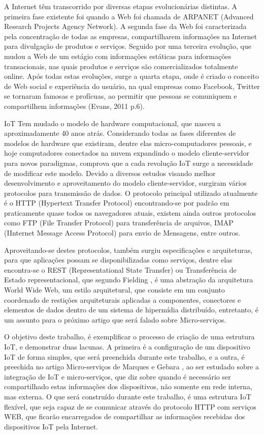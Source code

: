 \documentclass[journal]{IEEEtran}
\begin{document}
A Internet têm transcorrido por diversas etapas evolucionárias distintas. A primeira fase existente foi quando a Web foi chamada de ARPANET (Advanced Research Projects Agency Network). A segunda fase da Web foi caracterizada pela concentração de todas as empresas, compartilharem informações na Internet para divulgação de produtos e serviços. Seguido por uma terceira evolução, que mudou a Web de um estágio com informações estáticas para informações transacionais, nas quais produtos e serviços são comercializados totalmente online. Após todas estas evoluções, surge a quarta etapa, onde é criado o conceito de Web social e experiência do usuário, na qual empresas como Facebook, Twitter se tornaram famosas e profícuas, ao permitir que pessoas se comuniquem e compartilhem informações (Evans, 2011 p.6).

IoT Tem mudado o modelo de hardware computacional, que nasceu a aproximadamente 40 anos atrás. Considerando todas as fases diferentes de modelos de hardware que existiram, dentre elas micro-computadores pessoais, e hoje computadores conectados na nuvem expandindo o modelo cliente-servidor para novos paradigmas, comprova que a cada revolução IoT surge a necessidade de modificar este modelo.\cite[p.~6]{dzoneone} Devido a diversos estudos visando melhor desenvolvimento e aproveitamento do modelo cliente-servidor, surgiram vários protocolos para transmissão de dados. O protocolo principal utilizado atualmente é o HTTP (Hypertext Transfer Protocol) encontrando-se por padrão em praticamente quase todos os navegadores atuais, existem ainda outros protocolos como FTP (File Transfer Protocol) para transferência de arquivos, IMAP (IInternet Message Access Protocol) para envio de Mensagens, entre outros. 

Aproveitando-se destes protocolos, também surgiu especificações e arquiteturas, para que aplicações possam se disponibilizadas como serviços, dentre elas encontra-se o REST (Representational State Transfer) ou Transferência de Estado representacional, que segundo Fielding \cite{roythomasfielding2017}, é uma abstração da arquitetura World Wide Web, um estilo  arquitetural, que consiste em um conjunto coordenado de restições arquiteturais aplicadas a componentes, conectores e elementos de dados dentro de um sistema de hipermídia distribuído, entretanto, é um assunto para o próximo artigo que será falado sobre Micro-serviços.

O objetivo deste trabalho, é exemplificar o processo de criação de uma estrutura IoT, e demonstrar duas lacunas. A primeira é a configuração de um dispositivo IoT de forma simples, que será preenchida durante este trabalho, e a outra, é preechida no artigo Micro-serviços de Marques e Gebara \cite{MarquesMunif}, ao ser estudado sobre a integração de IoT e micro-serviços, que diz sobre quando é necessário ser compartilhado estas informações dos dispositivos, não somente em rede interna, mas externa. O que será construído durante este trabalho, é uma estrutura IoT flexível, que seja capaz de se comunicar através do protocolo HTTP com serviços WEB, que ficarão encarregados de compartilhar as informações recebidas dos dispositivos IoT pela Internet.
\end{document}
